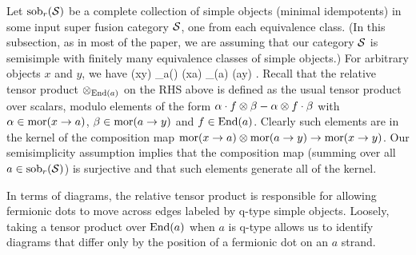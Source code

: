 Let $\text{sob}_r(\mathcal{S})$ be a complete collection of simple objects (minimal idempotents) in some 
input super fusion category $\mathcal{S}$, one from each equivalence class.
(In this subsection, as in most of the paper, we are assuming that our category $\mathcal{S}$ is semisimple with finitely many equivalence
classes of simple objects.)
For arbitrary objects $x$ and $y$, we have
\be \label{sobdecomp}
	\mor(x\to y) \: \cong \: \bigoplus_{a\in\sob(\spc)} \mor(x\to a) \tp_{\End(a)} \mor(a\to y) .
\ee
Recall that the relative tensor product $\otimes_{\text{End}(a)}$ on the RHS above is defined as the usual tensor product over scalars, modulo elements
of the form $\alpha \cdot f \otimes \beta - \alpha\otimes f \cdot \beta$ with $\alpha \in \text{mor}(x \to a)$, $\beta \in \text{mor}(a \to y)$ and $f\in \text{End}(a)$.
Clearly such elements are in the kernel of the composition map $\text{mor}(x\to a) \otimes \text{mor}(a\to y) \to \text{mor}(x\to y)$.
Our semisimplicity assumption implies that the composition map (summing over all $a\in \text{sob}_r(\mathcal{S})$) is surjective and that such
elements generate all of the kernel.

In terms of diagrams, the relative tensor product is responsible for allowing fermionic dots to move across edges labeled by q-type simple objects.
Loosely, taking a tensor product over $\text{End}(a)$ when $a$ is q-type allows us to identify diagrams that 
differ only by the position of a fermionic dot on an $a$ strand. 



